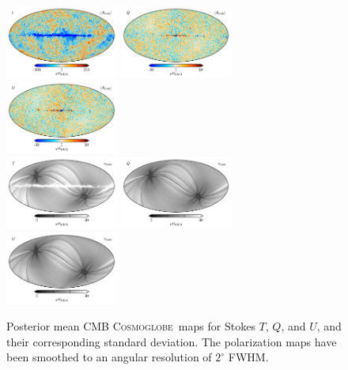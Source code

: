 \documentclass[twocolumn]{../../common/aa}
\newcommand{\cosmoglobe}{\textsc{Cosmoglobe}}
\begin{document}
\begin{figure}
	\includegraphics[width=0.33\textwidth]{figures/cmb_I_nodipole.pdf}
	\includegraphics[width=0.33\textwidth]{figures/cmb_Q.pdf}
	\includegraphics[width=0.33\textwidth]{figures/cmb_U.pdf}\\
	\includegraphics[width=0.33\textwidth]{figures/cmb_I_sigma.pdf}
	\includegraphics[width=0.33\textwidth]{figures/cmb_Q_sigma.pdf}
	\includegraphics[width=0.33\textwidth]{figures/cmb_U_sigma.pdf}\\
	\caption{Posterior mean CMB \cosmoglobe\ maps for Stokes $T$, $Q$, and $U$, and their corresponding standard deviation. The polarization maps have been smoothed to an angular resolution of $2^{\circ}$ FWHM.}
        \label{fig:cmb_posterior}
\end{figure}
\end{document}
